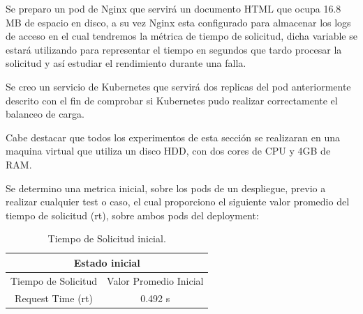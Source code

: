 



\par Se preparo un pod de Nginx que servirá un documento HTML que ocupa 16.8 MB de espacio en disco, a su vez Nginx esta configurado para almacenar los logs de acceso en el cual tendremos la métrica de tiempo de solicitud, dicha variable se estará utilizando para representar el tiempo en segundos que tardo procesar la solicitud y así estudiar el rendimiento durante una falla.\\

\par Se creo un servicio de Kubernetes que servirá dos replicas del pod anteriormente descrito con el fin de comprobar si Kubernetes pudo realizar correctamente el balanceo de carga.\\

\par Cabe destacar que todos los experimentos de esta sección se realizaran en una maquina virtual que utiliza un disco HDD, con dos cores de CPU y 4GB de RAM.\\

\par Se determino una metrica inicial, sobre los pods de un despliegue, previo a realizar cualquier test o caso, el cual proporciono el siguiente valor promedio del tiempo de solicitud (rt), sobre ambos pods del deployment:
\begin{table}[ht!]
\begin{center}
\begin{tabular}{ |c|c| } 
 \hline
 \multicolumn{2}{|c|}{Estado inicial} \\
 \hline
 \hline
 Tiempo de Solicitud & Valor Promedio Inicial\\
 \hline
 Request Time (rt) & 0.492 s\\
 \hline
\end{tabular}
\end{center}
\caption{Tiempo de Solicitud inicial.}
\label{tab:tabla406}
\end{table}

